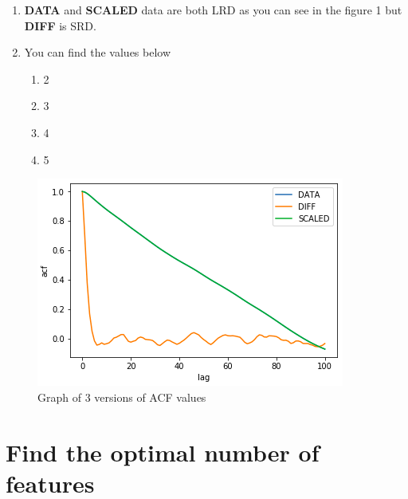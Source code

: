 \documentclass{article}
\begin{document}
\begin{enumerate}
	\item \textbf{DATA} and \textbf{SCALED} data are both LRD as you can 
		see in the figure 1 but \textbf{DIFF} is SRD.
	\item You can find the values below
		\begin{enumerate}
			\item 2
			\item 3
			\item 4
			\item 5
		\end{enumerate}
\end{enumerate}
\begin{figure}[h]
	\centering
	\includegraphics{acf-graph}
	\caption{Graph of 3 versions of ACF values}
\end{figure}

\section{Find the optimal number of features}
\end{document}
